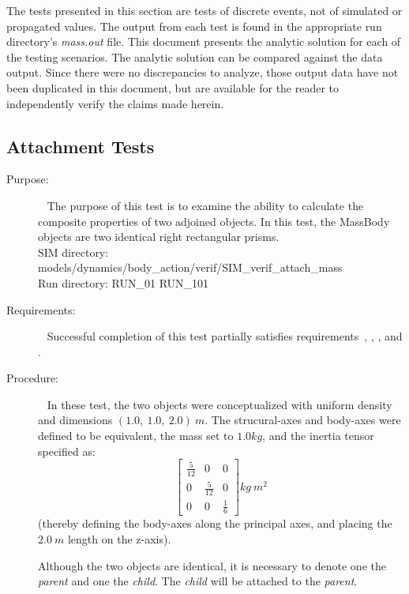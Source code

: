 The tests presented in this section are tests of discrete events, not of
simulated or propagated values.  The output from each test is found in the
appropriate run directory's \textit{mass.out} file.
This document presents the analytic solution for each of the testing
scenarios.  The analytic solution can be compared against the data output.
Since there were no
discrepancies to analyze, those output data have not been duplicated in this
document, but are available for the reader to independently verify the claims
made herein.

\subsection{Attachment Tests}
\label{test:mass_01}
\begin{description}
\item[Purpose:] \ \newline
The purpose of this test is to examine the ability to calculate the composite
properties of two adjoined objects.
In this test, the MassBody objects are two identical
right rectangular prisms.\\
SIM directory: models/dynamics/body\_action/verif/SIM\_verif\_attach\_mass\\
Run directory: RUN\_01 RUN\_101
\item[Requirements:] \ \newline
Successful completion of this test partially satisfies
requirements~, ,
, and .
\item[Procedure:]\ \newline
In these test, the two objects were conceptualized with uniform density and
dimensions $(1.0, ~1.0, ~2.0) ~m$.  The strucural-axes and body-axes were
defined to be equivalent, the mass set to $1.0 kg$, and the inertia tensor
specified
as:
\begin{equation*}
\begin{bmatrix} \frac{5}{12} & 0 & 0 \\ 0 & \frac{5}{12} & 0 \\ 0 & 0 &
\frac{1}{6} \end{bmatrix} kg ~ m^2
\end{equation*}
(thereby defining the body-axes along the principal axes, and placing the $2.0
~m$ length on the z-axis).

Although the two objects are identical, it is necessary to denote one the
\textit{parent} and one the \textit{child}.  The \textit{child} will be
attached to the \textit{parent}.


\end{description}

